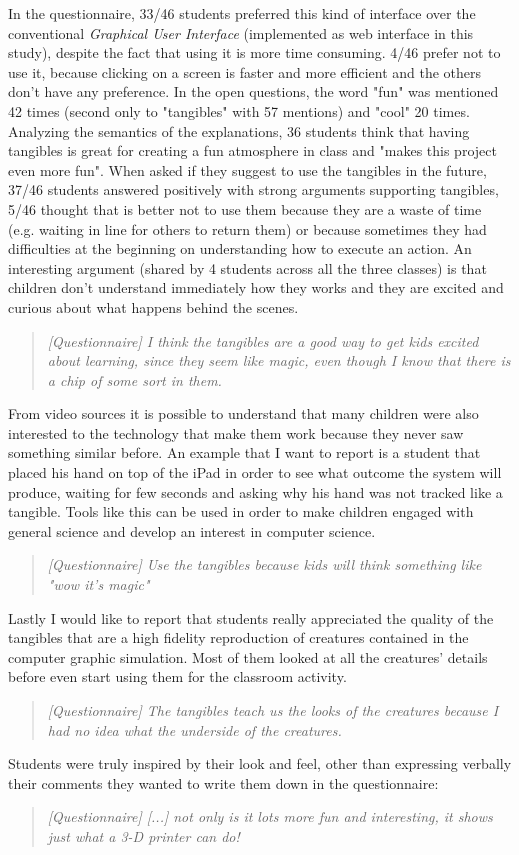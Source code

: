 In the questionnaire, 33/46 students preferred this kind of interface over the conventional \textit{Graphical User Interface} (implemented as web interface in this study), despite the fact that using it is more time consuming. 4/46 prefer not to use it, because clicking on a screen is faster and more efficient and the others don't have any preference. In the open questions, the word "fun" was mentioned 42 times (second only to "tangibles" with 57 mentions) and "cool" 20 times. Analyzing the semantics of the explanations, 36 students think that having tangibles is great for creating a fun atmosphere in class and "makes this project even more fun". When asked if they suggest to use the tangibles in the future, 37/46 students answered positively with strong arguments supporting tangibles, 5/46 thought that is better not to use them because they are a waste of time (e.g. waiting in line for others to return them) or because sometimes they had difficulties at the beginning on understanding how to execute an action. An interesting argument (shared by 4 students across all the three classes) is that children don't understand immediately how they works and they are excited and curious about what happens behind the scenes.
\begin{quote}
\textit{[Questionnaire]
I think the tangibles are a good way to get kids excited about learning, since they seem like magic, even though I know that there is a chip of some sort in them.}
\end{quote}
From video sources it is possible to understand that many children were also interested to the technology that make them work because they never saw something similar before. An example that I want to report is a student that placed his hand on top of the iPad in order to see what outcome the system will produce, waiting for few seconds and asking why his hand was not tracked like a tangible. Tools like this can be used in order to make children engaged with general science and develop an interest in computer science.
\begin{quote}
\textit{[Questionnaire]
Use the tangibles because kids will think something like "wow it's magic"}
\end{quote}

Lastly I would like to report that students really appreciated the quality of the tangibles that are a high fidelity reproduction of creatures contained in the computer graphic simulation. Most of them looked at all the creatures’ details before even start using them for the classroom activity.
\begin{quote}
\textit{[Questionnaire]
The tangibles teach us the looks of the creatures because I had no idea what the underside of the creatures.}
\end{quote}
Students were truly inspired by their look and feel, other than expressing verbally their comments they wanted to write them down in the questionnaire:
\begin{quote}
\textit{[Questionnaire]
[...] not only is it lots more fun and interesting, it shows just what a 3-D printer can do!}
\end{quote}

